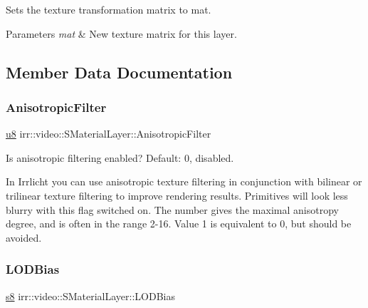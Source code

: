 Sets the texture transformation matrix to mat. 


\begin{DoxyParams}{Parameters}
{\em mat} & New texture matrix for this layer. \\
\hline
\end{DoxyParams}


\subsection{Member Data Documentation}
\mbox{\label{classirr_1_1video_1_1SMaterialLayer_aed142b316a920ec8fc5e0df09d3de3eb}} 
\subsubsection{\texorpdfstring{Anisotropic\+Filter}{AnisotropicFilter}}
{\footnotesize\ttfamily \hyperlink{namespaceirr_a646874f69af8ff87fc10201b0254a761}{u8} irr\+::video\+::\+S\+Material\+Layer\+::\+Anisotropic\+Filter}



Is anisotropic filtering enabled? Default\+: 0, disabled. 

In Irrlicht you can use anisotropic texture filtering in conjunction with bilinear or trilinear texture filtering to improve rendering results. Primitives will look less blurry with this flag switched on. The number gives the maximal anisotropy degree, and is often in the range 2-\/16. Value 1 is equivalent to 0, but should be avoided. \mbox{\label{classirr_1_1video_1_1SMaterialLayer_a5d1ac213ab5b7bcab23464eefd102b53}} 
\subsubsection{\texorpdfstring{L\+O\+D\+Bias}{LODBias}}
{\footnotesize\ttfamily \hyperlink{namespaceirr_adc3ec66d7537550be0fea1c9eeadd63d}{s8} irr\+::video\+::\+S\+Material\+Layer\+::\+L\+O\+D\+Bias}



